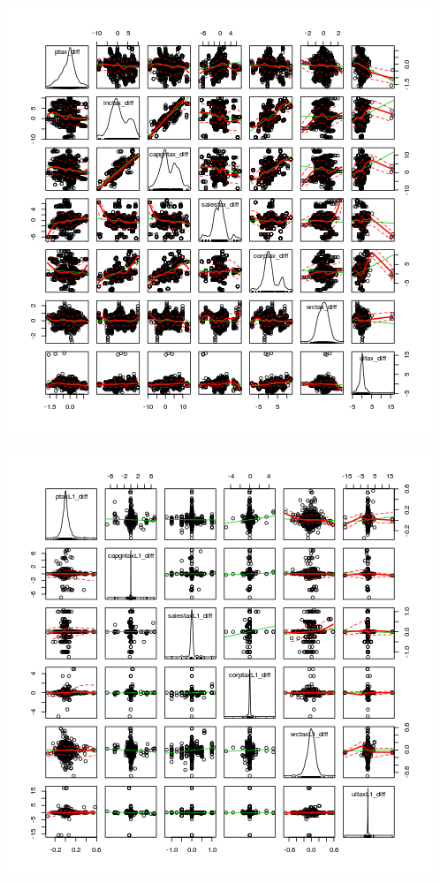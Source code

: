 \documentclass[12pt,a4paper]{article}
\begin{document}


\begin{figure}[h]\label{pairs}
    \centering
    \includegraphics[scale = 0.5]{../analysis/output/_--_pairs.png}
\end{figure}

\begin{figure}[h]\label{pairsL1}
\centering
\includegraphics[scale=0.5]{../analysis/output/_--_pairsL1.png}
\end{figure}
\end{document}
